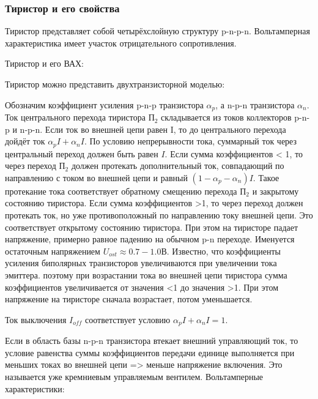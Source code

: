 \subsubsection{Тиристор и его свойства}

Тиристор представляет собой четырёхслойную структуру p-n-p-n. Вольтамперная характеристика имеет участок отрицательного сопротивления. 

Тиристор и его ВАХ:
\begin{center}
	\begin{figure}[h!]
		\caption{}	
	\end{figure}
\end{center}

Тиристор можно представить двухтранзисторной моделью:
\begin{center}
	\begin{figure}[h!]
		\caption{}	
	\end{figure}
\end{center}


Обозначим коэффициент усиления p-n-p транзистора $\alpha_p$, а n-p-n транзистора $\alpha_n$. Ток центрального перехода тиристора П$_2$ складывается из токов коллекторов p-n-p и n-p-n. Если ток во внешней цепи равен I, то до центрального перехода дойдёт ток $\alpha_pI + \alpha_nI$. По условию непрерывности тока, суммарный ток через центральный переход должен быть равен $I$. Если сумма коэффициентов < 1, то через переход П$_2$ должен протекать дополнительный ток, совпадающий по направлению с током во внешней цепи и равный $(1-\alpha_p - \alpha_n)I$. Такое протекание тока соответствует обратному смещению перехода П$_2$ и закрытому состоянию тиристора. Если сумма коэффициентов >1, то через переход должен протекать ток, но уже противоположный по направлению току внешней цепи. Это соответствует открытому состоянию тиристора. При этом на тиристоре падает напряжение, примерно равное падению на обычном p-n переходе. Именуется остаточным напряжением
$U_{ost} \approx 0.7-1.0$В. Известно, что коэффициенты усиления биполярных транзисторов увеличиваются при увеличении тока эмиттера. поэтому при возрастании тока во внешней цепи тиристора сумма коэффициентов увеличивается от значения <1 до значения >1. При этом напряжение на тиристоре сначала возрастает, потом уменьшается. 

Ток выключения $I_{off}$ соответствует условию $\alpha_pI + \alpha_nI = 1$.

Если в область базы n-p-n транзистора втекает внешний управляющий ток, то условие равенства суммы коэффициентов передачи единице выполняется при меньших токах во внешней цепи => меньше напряжение включения. Это называется уже кремниевым управляемым вентилем. Вольтамперные характеристики:

